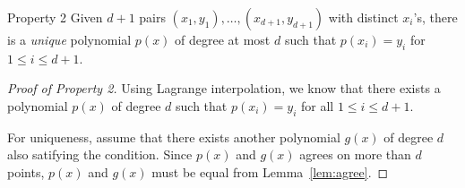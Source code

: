 \begin{frame}
  \begin{block}{Property 2}
    Given $d+1$ pairs
    $(x_1,y_1),\ldots,(x_{d+1},y_{d+1})$ with distinct $x_i$'s, there
    is a {\em unique} polynomial $p(x)$ of degree at most $d$ such
    that $p(x_i)=y_i$ for $1\leq i\leq d+1$.
  \end{block}

  \begin{proof}[Proof of Property 2]
    Using Lagrange interpolation, we know that there exists a
    polynomial $p(x)$ of degree $d$ such that $p(x_i)=y_i$ for all
    $1\leq i\leq d+1$.

    For uniqueness, assume that there exists another polynomial $g(x)$
    of degree $d$ also satifying the condition.  Since $p(x)$ and
    $g(x)$ agrees on more than $d$ points, $p(x)$ and $g(x)$ must be
    equal from Lemma~\ref{lem:agree}.
  \end{proof}
\end{frame}
